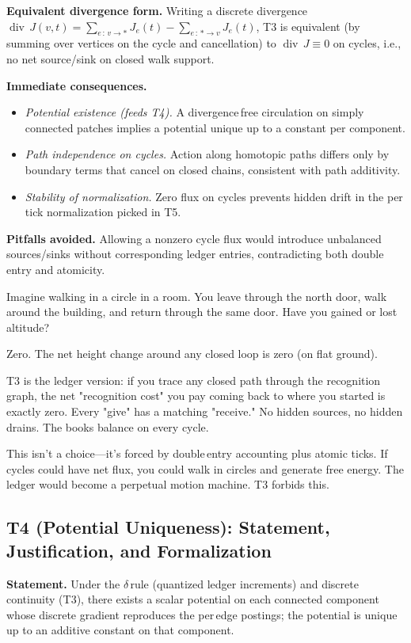 \documentclass[11pt]{article}
\begin{document}
\textbf{Equivalent divergence form.} Writing a discrete divergence $\operatorname{div}\,J(v,t)=\sum_{e\,:\,v\to *}J_e(t)-\sum_{e\,:\,*\to v}J_e(t)$, T3 is equivalent (by summing over vertices on the cycle and cancellation) to $\operatorname{div}\,J\equiv 0$ on cycles, i.e., no net source/sink on closed walk support.

\textbf{Immediate consequences.}
\begin{itemize}[leftmargin=*]
  \item \emph{Potential existence (feeds T4).} A divergence\,free circulation on simply\,connected patches implies a potential unique up to a constant per component.
  \item \emph{Path independence on cycles.} Action along homotopic paths differs only by boundary terms that cancel on closed chains, consistent with path additivity.
  \item \emph{Stability of normalization.} Zero flux on cycles prevents hidden drift in the per\,tick normalization picked in T5.
\end{itemize}

\textbf{Pitfalls avoided.} Allowing a nonzero cycle flux would introduce unbalanced sources/sinks without corresponding ledger entries, contradicting both double\,entry and atomicity.

\begin{intuitionbox}
Imagine walking in a circle in a room. You leave through the north door, walk around the building, and return through the same door. Have you gained or lost altitude?

Zero. The net height change around any closed loop is zero (on flat ground).

T3 is the ledger version: if you trace any closed path through the recognition graph, the net "recognition cost" you pay coming back to where you started is exactly zero. Every "give" has a matching "receive." No hidden sources, no hidden drains. The books balance on every cycle.

This isn't a choice—it's forced by double\,entry accounting plus atomic ticks. If cycles could have net flux, you could walk in circles and generate free energy. The ledger would become a perpetual motion machine. T3 forbids this.
\end{intuitionbox}

\subsection*{T4 (Potential Uniqueness): Statement, Justification, and Formalization}
\textbf{Statement.} Under the $\delta$\,rule (quantized ledger increments) and discrete continuity (T3), there exists a scalar potential on each connected component whose discrete gradient reproduces the per\,edge postings; the potential is unique up to an additive constant on that component.
\end{document}
